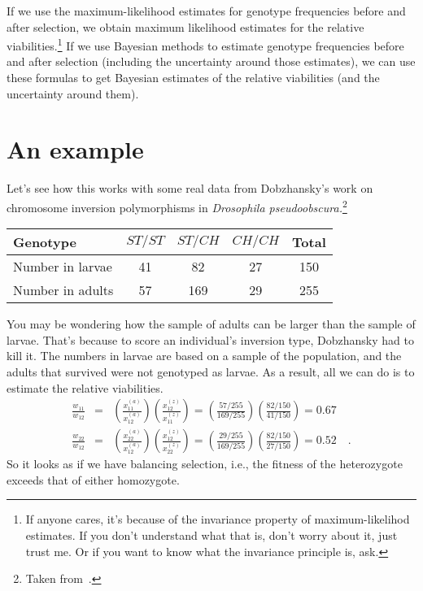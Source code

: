 \documentclass[12pt]{article}
\begin{document}
If we use the maximum-likelihood estimates for genotype frequencies
before and after selection, we obtain maximum likelihood estimates for
the relative viabilities.\footnote{If anyone cares, it's because of
  the invariance property of maximum-likelihod estimates. If you don't
  understand what that is, don't worry about it, just trust me. Or if
  you want to know what the invariance principle is, ask.} If we
use Bayesian methods to estimate genotype frequencies before and after
selection (including the uncertainty around those estimates), we can
use these formulas to get Bayesian estimates of the relative
viabilities (and the uncertainty around them).

\section*{An example}

Let's see how this works with some real data from Dobzhansky's work on
chromosome inversion polymorphisms in {\it Drosophila
pseudoobscura.}\footnote{Taken from~\cite{Dobzhansky-1947}.}

\begin{center}
\begin{tabular}{l|ccc|c}
\hline\hline
Genotype & $ST/ST$ & $ST/CH$ & $CH/CH$ & Total \\
\hline
Number in larvae & 41 & 82 & 27 & 150 \\
Number in adults & 57 & 169 & 29 & 255 \\
\hline
\end{tabular}
\end{center}

You may be wondering how the sample of adults can be larger than the
sample of larvae. That's because to score an individual's inversion
type, Dobzhansky had to kill it. The numbers in larvae are based on a
sample of the population, and the adults that survived were not
genotyped as larvae. As a result, all we can do is to estimate the
relative viabilities.
\begin{eqnarray*}
\frac{w_{11}}{w_{12}} &=& \left(\frac{x_{11}^{(a)}}{x_{12}^{(a)}}\right)
                          \left(\frac{x_{12}^{(z)}}{x_{11}^{(z)}}\right)
= \left(\frac{57/255}{169/255}\right)
  \left(\frac{82/150}{41/150}\right)
= 0.67 \\
\frac{w_{22}}{w_{12}} &=& \left(\frac{x_{22}^{(a)}}{x_{12}^{(a)}}\right)
                          \left(\frac{x_{12}^{(z)}}{x_{22}^{(z)}}\right)
= \left(\frac{29/255}{169/255}\right)
  \left(\frac{82/150}{27/150}\right)
= 0.52 \quad .
\end{eqnarray*}
So it looks as if we have balancing selection, i.e., the fitness of
the heterozygote exceeds that of either homozygote.
\end{document}
